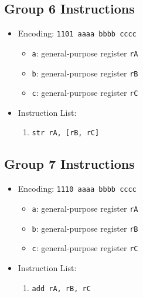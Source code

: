 \documentclass{article}
\begin{document}
	\subsection{Group 6 Instructions}
		\begin{itemize}
		\item Encoding:  \texttt{1101 aaaa bbbb cccc}
			\begin{itemize}
			\item \texttt{a}:  general-purpose register \texttt{rA}
			\item \texttt{b}:  general-purpose register \texttt{rB}
			\item \texttt{c}:  general-purpose register \texttt{rC}
			\end{itemize}
		\item Instruction List:
			\begin{enumerate}
			\item \texttt{str rA, [rB, rC]}
			\end{enumerate}
		\end{itemize}

	\subsection{Group 7 Instructions}
		\begin{itemize}
		\item Encoding:  \texttt{1110 aaaa bbbb cccc}
			\begin{itemize}
			\item \texttt{a}:  general-purpose register \texttt{rA}
			\item \texttt{b}:  general-purpose register \texttt{rB}
			\item \texttt{c}:  general-purpose register \texttt{rC}
			\end{itemize}

		\item Instruction List:
			\begin{enumerate}
			\item \texttt{add rA, rB, rC}
			\end{enumerate}
		\end{itemize}


\end{document}
